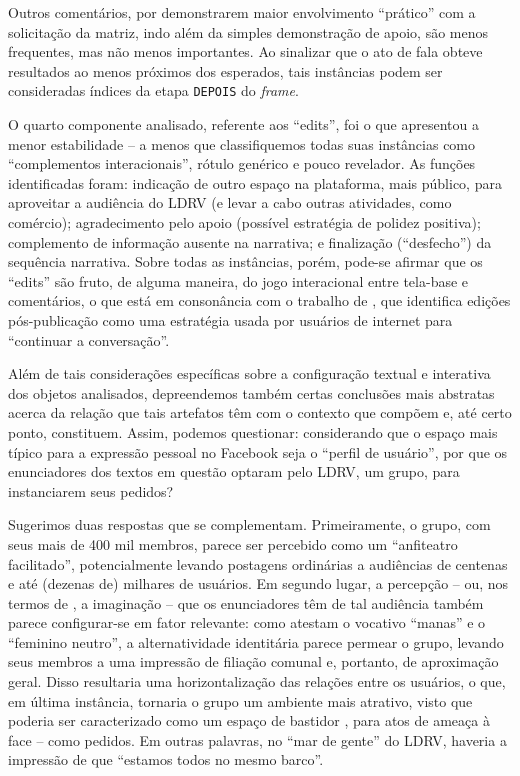 \documentclass{textolivre-html}
\begin{document}
Outros comentários, por demonstrarem maior envolvimento “prático” com a solicitação da matriz, indo além da simples demonstração de apoio, são menos frequentes, mas não menos importantes. Ao sinalizar que o ato de fala obteve resultados ao menos próximos dos esperados, tais instâncias podem ser consideradas índices da etapa \texttt{DEPOIS} do \textit{frame}.

O quarto componente analisado, referente aos “edits”, foi o que apresentou a menor estabilidade – a menos que classifiquemos todas suas instâncias como “complementos interacionais”, rótulo genérico e pouco revelador. As funções identificadas foram: indicação de outro espaço na plataforma, mais público, para aproveitar a audiência do LDRV (e levar a cabo outras atividades, como comércio); agradecimento pelo apoio (possível estratégia de polidez positiva); complemento de informação ausente na narrativa; e finalização (“desfecho”) da sequência narrativa. Sobre todas as instâncias, porém, pode-se afirmar que os “edits” são fruto, de alguma maneira, do jogo interacional entre tela-base e comentários, o que está em consonância com o trabalho de \textcite{gallagher2015}, que identifica edições pós-publicação como uma estratégia usada por usuários de internet para “continuar a conversação”.

Além de tais considerações específicas sobre a configuração textual e interativa dos objetos analisados, depreendemos também certas conclusões mais abstratas acerca da relação que tais artefatos têm com o contexto que compõem e, até certo ponto, constituem. Assim, podemos questionar: considerando que o espaço mais típico para a expressão pessoal no Facebook seja o “perfil de usuário”, por que os enunciadores dos textos em questão optaram pelo LDRV, um grupo, para instanciarem seus pedidos?

Sugerimos duas respostas que se complementam. Primeiramente, o grupo, com seus mais de 400 mil membros, parece ser percebido como um “anfiteatro facilitado”, potencialmente levando postagens ordinárias a audiências de centenas e até (dezenas de) milhares de usuários. Em segundo lugar, a percepção – ou, nos termos de \textcite{marwick2011}, a imaginação – que os enunciadores têm de tal audiência também parece configurar-se em fator relevante: como atestam o vocativo “manas” e o “feminino neutro”, a alternatividade identitária parece permear o grupo, levando seus membros a uma impressão de filiação comunal e, portanto, de aproximação geral. Disso resultaria uma horizontalização das relações entre os usuários, o que, em última instância, tornaria o grupo um ambiente mais atrativo, visto que poderia ser caracterizado como um espaço de bastidor \cite{goffman1985}, para atos de ameaça à face – como pedidos. Em outras palavras, no “mar de gente” do LDRV, haveria a impressão de que “estamos todos no mesmo barco”.
\end{document}
